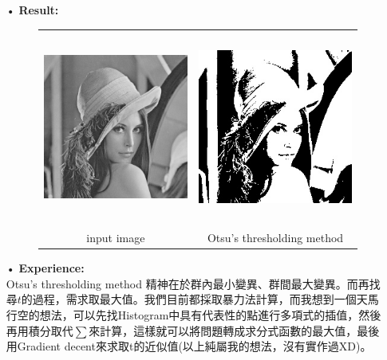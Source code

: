 \documentclass[12pt,a4paper]{article}
\begin{document}
\begin{enumerate}
\item[•]
{\bf Result:}\\
\begin{figure}[h]
\hspace*{3em}
\begin{tabular}{cc}
\includegraphics[height=2.5in]{image.jpg}&
\includegraphics[height=2.5in]{Otsus.jpg}\\
input image & Otsu’s thresholding method
\end{tabular}
\end{figure}

\item[•]
{\bf Experience:}\\
Otsu's thresholding method 精神在於群內最小變異、群間最大變異。而再找尋$t$的過程，需求取最大值。我們目前都採取暴力法計算，而我想到一個天馬行空的想法，可以先找Histogram中具有代表性的點進行多項式的插值，然後再用積分取代$\sum$來計算，這樣就可以將問題轉成求分式函數的最大值，最後用Gradient decent來求取t的近似值(以上純屬我的想法，沒有實作過XD)。
\end{enumerate}
\end{document}
